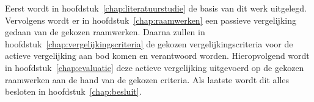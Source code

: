 Eerst wordt in hoofdstuk~\ref{chap:literatuurstudie} de basis van dit werk uitgelegd.
Vervolgens wordt er in hoofdstuk~\ref{chap:raamwerken} een passieve vergelijking gedaan van de gekozen raamwerken.
Daarna zullen in hoofdstuk~\ref{chap:vergelijkingscriteria} de gekozen vergelijkingscriteria voor de actieve vergelijking aan bod komen en verantwoord worden.
Hieropvolgend wordt in hoofdstuk~\ref{chap:evaluatie} deze actieve vergelijking uitgevoerd op de gekozen raamwerken aan de hand van de gekozen criteria.
Als laatste wordt dit alles besloten in hoofdstuk~\ref{chap:besluit}.


